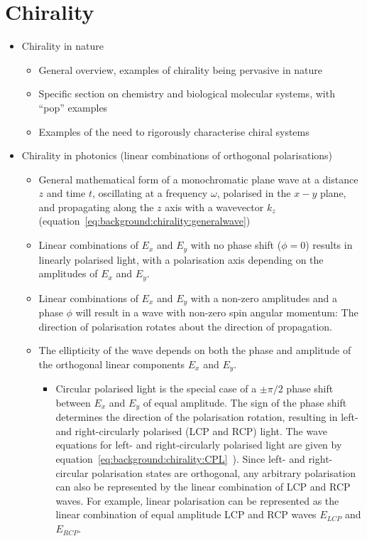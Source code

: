 \chapter{Chirality}\label{sec:background:Chirality}

\begin{itemize}
    \item Chirality in nature
    \begin{itemize}
        \item General overview, examples of chirality being pervasive in nature
        \item Specific section on chemistry and biological molecular systems, with ``pop'' examples
        \item Examples of the need to rigorously characterise chiral systems
    \end{itemize}
    \item Chirality in photonics (linear combinations of orthogonal polarisations)
    \begin{itemize}
        \item General mathematical form of a monochromatic plane wave at a distance $z$ and time $t$, oscillating at a frequency $\omega$, polarised in the $x-y$ plane, and propagating along the $z$ axis with a wavevector $k_z$ (equation~\ref{eq:background:chirality:generalwave})
        \item Linear combinations of $E_x$ and $E_y$ with no phase shift ($\phi=0$) results in linearly polarised light, with a polarisation axis depending on the amplitudes of $E_x$ and $E_y$.
        \item Linear combinations of $E_x$ and $E_y$ with a non-zero amplitudes and a phase $\phi$ will result in a wave with non-zero spin angular momentum: The direction of polarisation rotates about the direction of propagation.
        \item The ellipticity of the wave depends on both the phase and amplitude of the orthogonal linear components $E_x$ and $E_y$. 
        \begin{itemize}
            \item Circular polarised light is the special case of a $\pm \pi/2$ phase shift between $E_x$ and $E_y$ of equal amplitude. The sign of the phase shift determines the direction of the polarisation rotation, resulting in left- and right-circularly polarised (LCP and RCP) light. The wave equations for left- and right-circularly polarised light are given by equation~\ref{eq:background:chirality:CPL}~\cite[\S 8.1.2]{Hecht2013}). Since left- and right-circular polarisation states are orthogonal, any arbitrary polarisation can also be represented by the linear combination of LCP and RCP waves. For example, linear polarisation can be represented as the linear combination of equal amplitude LCP and RCP waves $E_{LCP}$ and $E_{RCP}$. 

\end{itemize}
\end{itemize}
\end{itemize}

